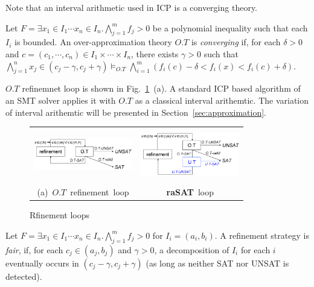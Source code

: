 \documentclass[runningheads,a4paper,oribibl]{llncs}
\begin{document}
Note that an interval arithmetic used in ICP is a converging theory. 

\begin{definition} \label{def:completeOT}
Let
$F = \exists x_1 \in I_1 \cdots x_n \in I_n. \bigwedge \limits_{j=1}^m f_j > 0$
be a polynomial inequality such that each $I_i$ is bounded. 
An over-approximation theory $O.T$ is {\em converging} 
if, for each $\delta > 0$ and $c = (c_1, \cdots, c_n) \in I_1 \times \cdots \times I_n$, 
there exists $\gamma > 0$ such that 
$\bigwedge \limits_{j=1}^n x_j \in (c_j - \gamma, c_j + \gamma) \models_{O.T} 
 \bigwedge \limits_{i=1}^m (f_i(c) - \delta < f_i(x) < f_i(c) + \delta)$. 
\end{definition}

$O.T$ refinemnet loop is shown in Fig.~\ref{fig:OTrefine}~(a). 
A standard ICP based algorithm of an SMT solver applies it with $O.T$ as a classical interval arithemtic. 
The variation of interval arithemtic will be presented in Section~\ref{sec:approximation}. 
\begin{figure}[ht]
\begin{minipage}[b]{1.0\linewidth}
\centering
\begin{tabular}{c@{\qquad}c}
\includegraphics[height=0.6in,width=1.7in]{OTloop.png} & 
\includegraphics[height=0.9in,width=1.7in]{rasatloop.png} \\   
\mbox{(a) $O.T$ refinement loop} & \mbox{{\bf raSAT} loop} \\
\end{tabular}
\end{minipage} 
\caption{Rfinement loops} 
\label{fig:OTrefine} 
\end{figure}


\begin{definition} 
Let
$F = \exists x_1 \in I_1 \cdots x_n \in I_n. \bigwedge \limits_{j=1}^m f_j > 0$
for $I_i = (a_i,b_i)$.
A refinement strategy is {\em fair}, if, for each $c_j \in (a_j,b_j)$ and $\gamma > 0$, 
a decomposition of $I_i$ for each $i$ eventually occurs in $(c_j - \gamma, c_j + \gamma)$ 
(as long as neither SAT nor UNSAT is detected). 
\end{definition}
\end{document}
